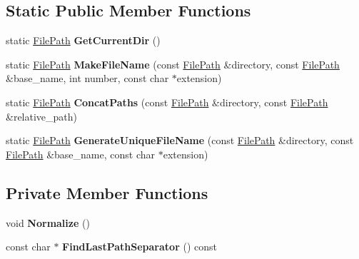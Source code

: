 \subsection*{Static Public Member Functions}
\begin{DoxyCompactItemize}
\item 
\mbox{\label{classtesting_1_1internal_1_1_file_path_a0f7b48e493656679cb82a2b679620c4e}} 
static \hyperlink{classtesting_1_1internal_1_1_file_path}{File\+Path} {\bfseries Get\+Current\+Dir} ()
\item 
\mbox{\label{classtesting_1_1internal_1_1_file_path_a1e7793eaae21c6629afe8be11064b111}} 
static \hyperlink{classtesting_1_1internal_1_1_file_path}{File\+Path} {\bfseries Make\+File\+Name} (const \hyperlink{classtesting_1_1internal_1_1_file_path}{File\+Path} \&directory, const \hyperlink{classtesting_1_1internal_1_1_file_path}{File\+Path} \&base\+\_\+name, int number, const char $\ast$extension)
\item 
\mbox{\label{classtesting_1_1internal_1_1_file_path_ad58aa6d8b160d0ba0b661f56f0980e26}} 
static \hyperlink{classtesting_1_1internal_1_1_file_path}{File\+Path} {\bfseries Concat\+Paths} (const \hyperlink{classtesting_1_1internal_1_1_file_path}{File\+Path} \&directory, const \hyperlink{classtesting_1_1internal_1_1_file_path}{File\+Path} \&relative\+\_\+path)
\item 
\mbox{\label{classtesting_1_1internal_1_1_file_path_ab22637ea53e3918ec814dc6a5fecd1f9}} 
static \hyperlink{classtesting_1_1internal_1_1_file_path}{File\+Path} {\bfseries Generate\+Unique\+File\+Name} (const \hyperlink{classtesting_1_1internal_1_1_file_path}{File\+Path} \&directory, const \hyperlink{classtesting_1_1internal_1_1_file_path}{File\+Path} \&base\+\_\+name, const char $\ast$extension)
\end{DoxyCompactItemize}
\subsection*{Private Member Functions}
\begin{DoxyCompactItemize}
\item 
\mbox{\label{classtesting_1_1internal_1_1_file_path_aa2f6d7d7823f71f25de50d309c966ef7}} 
void {\bfseries Normalize} ()
\item 
\mbox{\label{classtesting_1_1internal_1_1_file_path_a6bc94d147f47a031221c976bf5e01456}} 
const char $\ast$ {\bfseries Find\+Last\+Path\+Separator} () const
\end{DoxyCompactItemize}
